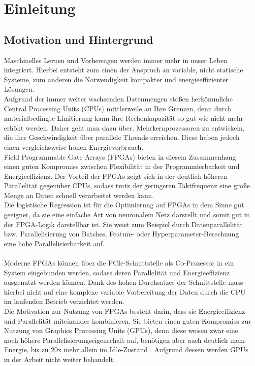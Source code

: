 \chapter{Einleitung}
\section{Motivation und Hintergrund}
Maschinelles Lernen und Vorhersagen werden immer mehr in unser Leben integriert. Hierbei entsteht zum einen der Anspruch an variable, nicht statische Systeme, zum anderen die Notwendigkeit kompakter und energieeffizienter Lösungen.\\
Aufgrund der immer weiter wachsenden Datenmengen stoßen herkömmliche Central Processing Units (CPUs) mittlerweile an Ihre Grenzen, denn durch materialbedingte Limitierung kann ihre Rechenkapazität so gut wie nicht mehr erhöht werden. Daher geht man dazu über, Mehrkernprozessoren zu entwickeln, die ihre Geschwindigkeit über parallele Threads erreichen. Diese haben jedoch einen vergleichsweise hohen Energieverbrauch.\\
Field Programmable Gate Arrays (FPGAs) bieten in diesem Zusammenhang einen guten Kompromiss zwischen Flexibilität in der Programmierbarkeit und Energieeffizienz. Der Vorteil der FPGAs zeigt sich in der deutlich höheren Parallelität gegenüber CPUs, sodass trotz der geringeren Taktfrequenz eine große Menge an Daten schnell verarbeitet werden kann.\\
Die logistische Regression ist für die Optimierung auf FPGAs in dem Sinne gut geeignet, da sie eine einfache Art von neuronalem Netz darstellt und somit gut in der FPGA-Logik darstellbar ist. Sie weist zum Beispiel durch Datenparallelität bzw. Parallelisierung von Batches, Feature- oder Hyperparameter-Berechnung eine hohe Parallelisierbarkeit auf.\\\\
Moderne FPGAs können über die PCIe-Schnittstelle als Co-Prozessor in ein System eingebunden werden, sodass deren Parallelität und Energieeffizienz ausgenutzt werden können. Dank des hohen Durchsatzes der Schnittstelle muss hierbei nicht auf eine komplexe variable Vorbereitung der Daten durch die CPU im laufenden Betrieb verzichtet werden.\\
Die Motivation zur Nutzung von FPGAs besteht darin, dass sie Energieeffizienz und Parallelität miteinander kombinieren. Sie bieten einen guten Kompromiss zur Nutzung von Graphics Processing Units (GPUs), denn diese weisen zwar eine noch höhere Parallelisierungseigenschaft auf, benötigen aber auch deutlich mehr Energie, bis zu 20x mehr allein im Idle-Zustand \cite{GPU}. Aufgrund dessen werden GPUs in der Arbeit nicht weiter behandelt.

